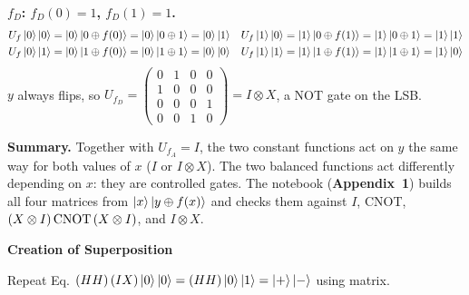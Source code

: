 \documentclass[a4paper, 10pt]{article}
\begin{document}
\begin{solution}
	\noindent \textbf{\( f_D \): \( f_D(0) = 1 \), \( f_D(1) = 1 \).}
	\begin{align*}
		U_f\ket{0}\ket{0} & = \ket{0}\ket{0 \oplus f(0)} = \ket{0}\ket{0 \oplus 1} = \ket{0}\ket{1} &
		U_f\ket{1}\ket{0} & = \ket{1}\ket{0 \oplus f(1)} = \ket{1}\ket{0 \oplus 1} = \ket{1}\ket{1}   \\
		U_f\ket{0}\ket{1} & = \ket{0}\ket{1 \oplus f(0)} = \ket{0}\ket{1 \oplus 1} = \ket{0}\ket{0} &
		U_f\ket{1}\ket{1} & = \ket{1}\ket{1 \oplus f(1)} = \ket{1}\ket{1 \oplus 1} = \ket{1}\ket{0}
	\end{align*}
	\( y \) always flips, so \( U_{f_D} = \begin{pmatrix} 0 & 1 & 0 & 0 \\ 1 & 0 & 0 & 0 \\ 0 & 0 & 0 & 1 \\ 0 & 0 & 1 & 0 \end{pmatrix} = I \otimes X \), a NOT gate on the LSB.

	\noindent \textbf{Summary.} Together with \( U_{f_A} = I \), the two constant functions act on \( y \) the same way for both values of \( x \) (\( I \) or \( I \otimes X \)). The two balanced functions act differently depending on \( x \): they are controlled gates.
	The notebook (\textbf{Appendix~1}) builds all four matrices from \( \ket{x}\ket{y \oplus f(x)} \) and checks them against \( I \), CNOT, \( \left(X \otimes I\right)\mathrm{CNOT}\left(X \otimes I\right) \), and \( I \otimes X \).
\end{solution}

\begin{problem}
\textbf{Creation of Superposition}
\par Repeat Eq. \( \left(HH\right)\left(IX\right)\ket{0}\ket{0} = \left(HH\right)\ket{0}\ket{1} = \ket{+}\ket{-} \) using matrix.
\end{problem}
\end{document}
